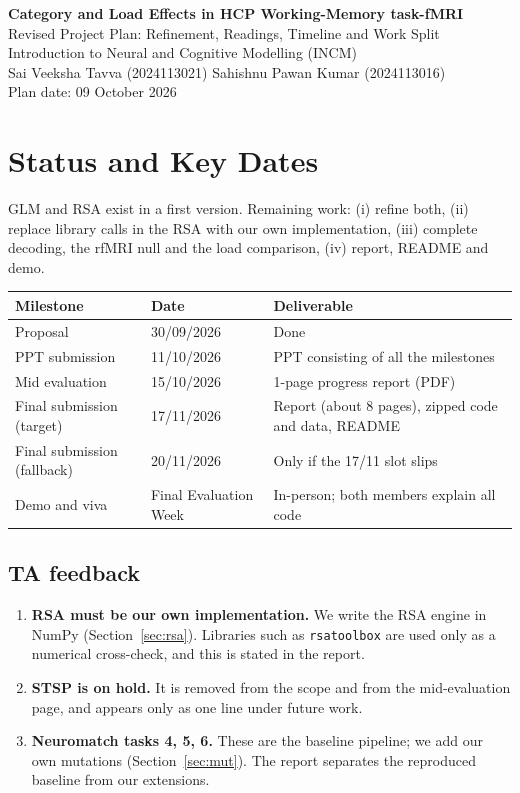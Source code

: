 \documentclass[11pt,a4paper]{article}
\begin{document}
\begin{center}
{\Large\bfseries Category and Load Effects in HCP Working-Memory task-fMRI}\\[4pt]
Revised Project Plan: Refinement, Readings, Timeline and Work Split\\[2pt]
Introduction to Neural and Cognitive Modelling (INCM)\\[2pt]
Sai Veeksha Tavva (2024113021) \quad Sahishnu Pawan Kumar (2024113016)\\[2pt]
Plan date: 09 October 2026
\end{center}

\section{Status and Key Dates}

GLM and RSA exist in a first version. Remaining work: (i) refine both, (ii) replace library calls in the RSA with our own implementation, (iii) complete decoding, the rfMRI null and the load comparison, (iv) report, README and demo.

\begin{xltabular}{\linewidth}{@{}p{3.8cm}p{2.8cm}Y@{}}
\toprule
\textbf{Milestone} & \textbf{Date} & \textbf{Deliverable}\\
\midrule
\endhead
Proposal & 30/09/2026 & Done\\
PPT submission & 11/10/2026 & PPT consisting of all the milestones \\
Mid evaluation & 15/10/2026 & 1-page progress report (PDF)\\
Final submission (target) & 17/11/2026 & Report (about 8 pages), zipped code and data, README\\
Final submission (fallback) & 20/11/2026 & Only if the 17/11 slot slips\\
Demo and viva & Final Evaluation Week & In-person; both members explain all code\\
\bottomrule
\end{xltabular}

\subsection*{TA feedback}
\begin{enumerate}
\item \textbf{RSA must be our own implementation.} We write the RSA engine in NumPy (Section~\ref{sec:rsa}). Libraries such as \texttt{rsatoolbox} are used only as a numerical cross-check, and this is stated in the report.
\item \textbf{STSP is on hold.} It is removed from the scope and from the mid-evaluation page, and appears only as one line under future work.
\item \textbf{Neuromatch tasks 4, 5, 6.} These are the baseline pipeline; we add our own mutations (Section~\ref{sec:mut}). The report separates the reproduced baseline from our extensions.
\end{enumerate}
\end{document}
